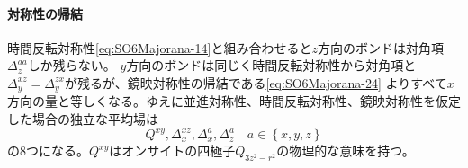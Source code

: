 \documentclass[11pt, aps, longbibliography]{article}
\begin{document}
        \begin{tcolorbox}
            \paragraph{対称性の帰結}
            時間反転対称性\eqref{eq:SO6Majorana-14}と組み合わせると$z$方向のボンドは対角項$\Delta_z^{aa}$しか残らない。
            $y$方向のボンドは同じく時間反転対称性から対角項と$\Delta_y^{xz}=\Delta_y^{zx}$が残るが、鏡映対称性の帰結である\eqref{eq:SO6Majorana-24}
            よりすべて$x$方向の量と等しくなる。ゆえに並進対称性、時間反転対称性、鏡映対称性を仮定した場合の独立な平均場は
            \begin{equation}\label{eq:SO6Majorana-25}
                Q^{xy}, \Delta_x^{xz}, \Delta_{x}^{a}, \Delta_{z}^{a} \quad a\in \left\{ x,y,z \right\}
            \end{equation}
            の8つになる。$Q^{xy}$はオンサイトの四極子$Q_{3z^2-r^2}$の物理的な意味を持つ。
        \end{tcolorbox}
        
\end{document}
